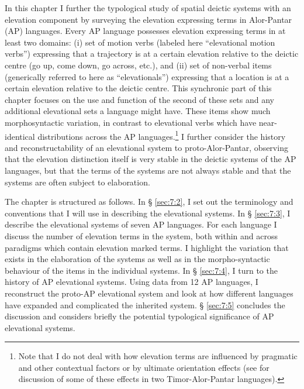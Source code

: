 In this chapter I further the typological study of spatial deictic systems with an elevation component by surveying the elevation expressing terms in Alor-Pantar (AP) languages. Every AP language possesses elevation expressing terms in at least two domains: (i) set of motion verbs (labeled here ``elevational motion verbs'') expressing that a trajectory is at a certain elevation relative to the deictic centre (go up, come down, go across, etc.), and (ii) set of non-verbal items (generically referred to here as ``elevationals'') expressing that a location is at a certain elevation relative to the deictic centre. This synchronic part of this chapter focuses on the use and function of the second of these sets and any additional elevational sets a language might have. These items show much morphosyntactic variation, in contrast to elevational verbs which have near-identical distributions across the AP languages.\footnote{Note that I do not deal with how elevation terms are influenced by pragmatic and other contextual factors or by ultimate orientation effects (see \citealt{Schapper2012} for discussion of some of these effects in two Timor-Alor-Pantar languages).} I further consider the history and reconstructability of an elevational system to proto-Alor-Pantar, observing that the elevation distinction itself is very stable in the deictic systems of the AP languages, but that the terms of the systems are not always stable and that the systems are often subject to elaboration. 

The chapter is structured as follows. In {\S} \ref{sec:7:2}, I set out the terminology and conventions that I will use in describing the elevational systems. In {\S} \ref{sec:7:3}, I describe the elevational systems of seven AP languages. For each language I discuss the number of elevation terms in the system, both within and across paradigms which contain elevation marked terms. I highlight the variation that exists in the elaboration of the systems as well as in the morpho-syntactic behaviour of the items in the individual systems. In {\S} \ref{sec:7:4}, I turn to the history of AP elevational systems. Using data from 12 AP languages, I reconstruct the proto-AP elevational system and look at how different languages have expanded and complicated the inherited system. {\S} \ref{sec:7:5} concludes the discussion and considers briefly the potential typological significance of AP elevational systems.

